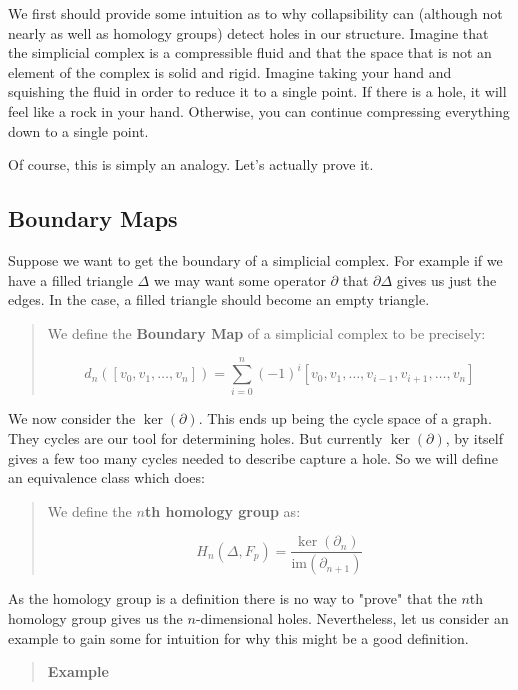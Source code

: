 \documentclass[letterpaper,12pt]{article}
\begin{document}
We first should provide some intuition as to why collapsibility can (although not nearly as well as homology groups) detect holes in our structure. Imagine that the simplicial complex is a compressible fluid and that the space that is not an element of the complex is solid and rigid. Imagine taking your hand and squishing the fluid in order to reduce it to a single point. If there is a hole, it will feel like a rock in your hand. Otherwise, you can continue compressing everything down to a single point.

Of course, this is simply an analogy. Let's actually prove it.

\subsection{Boundary Maps}

Suppose we want to get the boundary of a simplicial complex. For example if we have a filled triangle $\Delta$ we may want some operator $\partial$ that $\partial \Delta$ gives us just the edges. In the case, a filled triangle should become an empty triangle.

\begin{quote}
    We define the \textbf{Boundary Map} of a simplicial complex to be precisely:
    
    $$d_n([v_0,v_1,\ldots,v_n]) = \sum_{i=0}^n (-1)^i[v_0,v_1,\ldots,v_{i-1},v_{i+1},\ldots,v_n ]$$
\end{quote}

We now consider the $\ker(\partial)$. This ends up being the cycle space of a graph. They cycles are our tool for determining holes. But currently $\ker(\partial)$, by itself gives a few too many cycles needed to describe capture a hole. So we will define an equivalence class which does:

\begin{quote}
    We define the $n$\textbf{th homology group} as:

    $$H_n(\Delta, F_p) = \frac{\ker(\partial_n)}{\text{im}(\partial_{n+1})}$$
\end{quote}

As the homology group is a definition there is no way to "prove" that the $n$th homology group gives us the $n$-dimensional holes. Nevertheless, let us consider an example to gain some for intuition for why this might be a good definition.

\begin{quote}
    \textbf{Example}
\end{quote}
\end{document}
